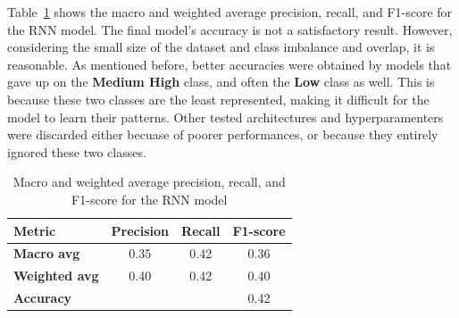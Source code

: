 Table~\ref{tab:macro_weighted_avg} shows the macro and weighted average precision,
recall, and F1-score for the RNN model.
The final model's accuracy is not a satisfactory result.
However, considering the small size of the dataset and
class imbalance and overlap, it is reasonable.
As mentioned before, better accuracies were
obtained by models that gave up on the \textbf{Medium High} class, and often
the \textbf{Low} class as well. This is because these two classes are the
least represented, making it difficult for the model to learn their patterns.
Other tested architectures and hyperparamenters were discarded either becuase of
poorer performances, or because they entirely ignored these two classes.

\begin{table}[H]
    \centering
    \begin{tabular}{lccc}
        \toprule
        \textbf{Metric} & \textbf{Precision} & \textbf{Recall} & \textbf{F1-score} \\
        \midrule
        \textbf{Macro avg}    & 0.35 & 0.42 & 0.36 \\
        \textbf{Weighted avg} & 0.40 & 0.42 & 0.40 \\
        \midrule
        \textbf{Accuracy}     & & & 0.42 \\
        \bottomrule
    \end{tabular}
    \caption{Macro and weighted average precision, recall, and F1-score for the RNN model}
    \label{tab:macro_weighted_avg}
\end{table}
